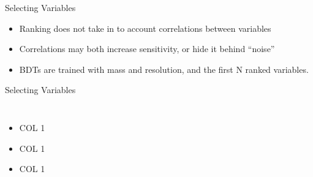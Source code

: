 \documentclass[t]{beamer}
\begin{document}
\begin{frame}{Selecting Variables}
  \begin{itemize}  
    \item Ranking does not take in to account correlations between variables
    \item Correlations may both increase sensitivity, or hide it behind
``noise''
    \item BDTs are trained with mass and resolution, and the first N ranked
variables.
  \end{itemize}
\end{frame}

\begin{frame}{Selecting Variables}
  \begin{columns}[c]
  \begin{itemize}
    \item COL 1
    \item COL 1
    \item COL 1
  \end{itemize}
  \end{columns}
\end{frame}
\end{document}
